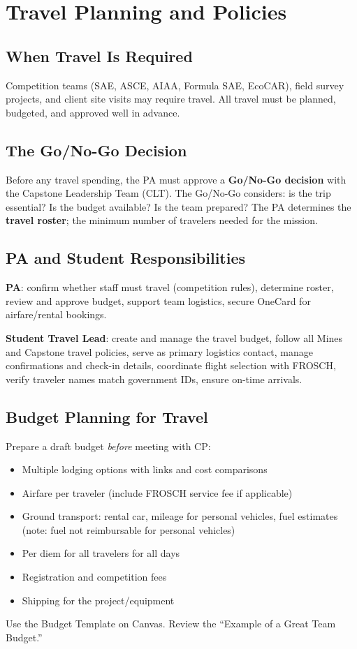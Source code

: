 \chapter{Travel Planning and Policies}

\section{When Travel Is Required}
Competition teams (SAE, ASCE, AIAA, Formula SAE, EcoCAR), field survey projects, and client site visits may require travel. All travel must be planned, budgeted, and approved well in advance.

\section{The Go/No-Go Decision}
Before any travel spending, the PA must approve a \textbf{Go/No-Go decision} with the Capstone Leadership Team (CLT). The Go/No-Go considers: is the trip essential? Is the budget available? Is the team prepared? The PA determines the \textbf{travel roster}; the minimum number of travelers needed for the mission.

\section{PA and Student Responsibilities}
\textbf{PA}: confirm whether staff must travel (competition rules), determine roster, review and approve budget, support team logistics, secure OneCard for airfare/rental bookings.

\textbf{Student Travel Lead}: create and manage the travel budget, follow all Mines and Capstone travel policies, serve as primary logistics contact, manage confirmations and check-in details, coordinate flight selection with FROSCH, verify traveler names match government IDs, ensure on-time arrivals.

\section{Budget Planning for Travel}
Prepare a draft budget \emph{before} meeting with CP:
\begin{itemize}[nosep,leftmargin=1.5em]
\item Multiple lodging options with links and cost comparisons
\item Airfare per traveler (include FROSCH service fee if applicable)
\item Ground transport: rental car, mileage for personal vehicles, fuel estimates (note: fuel not reimbursable for personal vehicles)
\item Per diem for all travelers for all days
\item Registration and competition fees
\item Shipping for the project/equipment
\end{itemize}
Use the Budget Template on Canvas. Review the ``Example of a Great Team Budget.''

